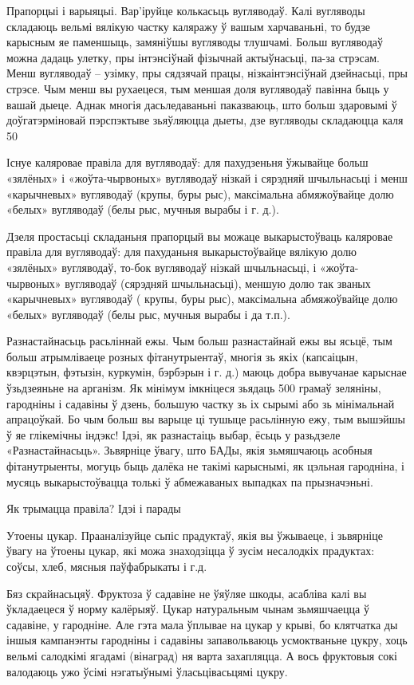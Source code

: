 Прапорцыі і варыяцыі.
Вар'іруйце колькасьць вугляводаў. Калі вугляводы складаюць вельмі вялікую частку каляражу ў вашым харчаваньні, то будзе карысным яе паменшыць, замяніўшы вугляводы тлушчамі. Больш вугляводаў можна дадаць улетку, пры інтэнсіўнай фізычнай актыўнасьці, па-за стрэсам. Менш вугляводаў – узімку, пры сядзячай працы, нізкаінтэнсіўнай дзейнасьці, пры стрэсе. Чым менш вы рухаецеся, тым меншая доля вугляводаў павінна быць у вашай дыеце. Аднак многія дасьледаваньні паказваюць, што больш здаровымі ў доўгатэрміновай пэрспэктыве зьяўляюцца дыеты, дзе вугляводы складаюцца каля 50%

Існуе каляровае правіла для вугляводаў: для пахудзеньня ўжывайце больш «зялёных» і «жоўта-чырвоных» вугляводаў нізкай і сярэдняй шчыльнасьці і менш «карычневых» вугляводаў (крупы, буры рыс), максімальна абмяжоўвайце долю «белых» вугляводаў (белы рыс, мучныя вырабы і г. д.).

Дзеля простасьці складаньня прапорцый вы можаце выкарыстоўваць каляровае правіла для вугляводаў: для пахуданьня выкарыстоўвайце вялікую долю «зялёных» вугляводаў, то-бок вугляводаў нізкай шчыльнасьці, і «жоўта-чырвоных» вугляводаў (сярэдняй шчыльнасьці), меншую долю так званых «карычневых» вугляводаў ( крупы, буры рыс), максімальна абмяжоўвайце долю «белых» вугляводаў (белы рыс, мучныя вырабы і да т.п.).

Разнастайнасьць расьліннай ежы.
Чым больш разнастайнай ежы вы ясьцё, тым больш атрымліваеце розных фітанутрыентаў, многія зь якіх (капсаіцын, квэрцэтын, фэтызін, куркумін, бэрбэрын і г. д.) маюць добра вывучанае карыснае ўзьдзеяньне на арганізм. Як мінімум імкніцеся зьядаць 500 грамаў зеляніны, гародніны і садавіны ў дзень, большую частку зь іх сырымі або зь мінімальнай апрацоўкай. Бо чым больш вы варыце ці тушыце расьлінную ежу, тым вышэйшы ў яе глікемічны індэкс! Ідэі, як разнастаіць выбар, ёсьць у разьдзеле «Разнастайнасьць». Зьвярніце ўвагу, што БАДы, якія зьмяшчаюць асобныя фітанутрыенты, могуць быць далёка не такімі карыснымі, як цэльная гародніна, і мусяць выкарыстоўвацца толькі ў абмежаваных выпадках па прызначэньні.

Як трымацца правіла? Ідэі і парады

Утоены цукар.
Прааналізуйце сьпіс прадуктаў, якія вы ўжываеце, і зьвярніце ўвагу на ўтоены цукар, які можа знаходзіцца ў зусім несалодкіх прадуктах: соўсы, хлеб, мясныя паўфабрыкаты і г.д.

Бяз скрайнасьцяў.
Фруктоза ў садавіне не ўяўляе шкоды, асабліва калі вы ўкладаецеся ў норму калёрыяў. Цукар натуральным чынам зьмяшчаецца ў садавіне, у гародніне. Але гэта мала ўплывае на цукар у крыві, бо клятчатка ды іншыя кампанэнты гародніны і садавіны запавольваюць усмоктваньне цукру, хоць вельмі салодкімі ягадамі (вінаград) ня варта захапляцца. А вось фруктовыя сокі валодаюць ужо ўсімі нэгатыўнымі ўласьцівасьцямі цукру.

